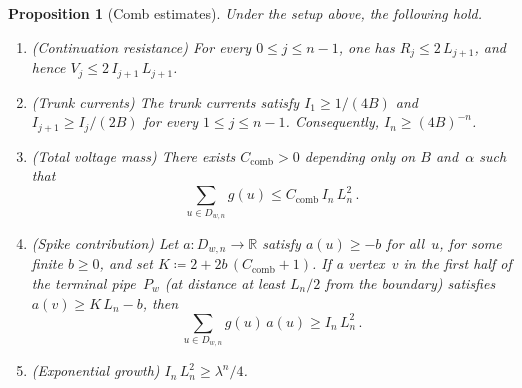 \documentclass[aop]{imsart}
\theoremstyle{plain}
\newtheorem{proposition}[theorem]{Proposition}
\theoremstyle{definition}
\newcommand{\R}{\mathbb{R}}
\begin{document}
	\begin{proposition}[Comb estimates]\label{prop:comb-estimates}
		Under the setup above, the following hold.
		\begin{enumerate}[label=\textup{(\alph*)}]
			\item \textup{(Continuation resistance)}\; For every $0\leq j\leq n{-}1$, one has $R_j\leq 2\,L_{j+1}$, and hence $V_j\leq 2\,I_{j+1}\,L_{j+1}$.
			\item \textup{(Trunk currents)}\; The trunk currents satisfy $I_1\geq 1/(4B)$ and $I_{j+1}\geq I_j/(2B)$ for every $1\leq j\leq n{-}1$. Consequently, $I_n\geq(4B)^{-n}$.
			\item \textup{(Total voltage mass)}\; There exists $C_{\mathrm{comb}}>0$ depending only on $B$ and~$\alpha$ such that
			\[
			\sum_{u\in D_{w,n}}g(u)\leq C_{\mathrm{comb}}\,I_n\,L_n^2\,.
			\]
			\item \textup{(Spike contribution)}\; Let $a\colon D_{w,n}\to\R$ satisfy $a(u)\geq -b$ for all~$u$, for some finite $b\geq 0$, and set $K\coloneqq 2+2b\,(C_{\mathrm{comb}}+1)$. If a vertex~$v$ in the first half of the terminal pipe~$P_w$ (at distance at least $L_n/2$ from the boundary) satisfies $a(v)\geq K\,L_n-b$, then
			\[
			\sum_{u\in D_{w,n}}g(u)\,a(u)\geq I_n\,L_n^2\,.
			\]
			\item \textup{(Exponential growth)}\; $I_n\,L_n^2\geq\lambda^n/4$.
		\end{enumerate}
	\end{proposition}
	
\end{document}
